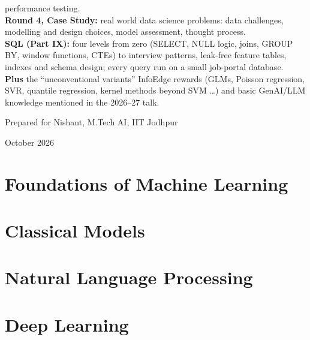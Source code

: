 \documentclass[11pt,openany]{book}
\begin{document}
\begin{titlepage}
\begin{tcolorbox}[colback=accentlight,colframe=accent,width=0.86\linewidth,arc=2pt,boxrule=0.6pt]
performance testing.\\[3pt]
\textbf{Round 4, Case Study:} real world data science problems: data challenges, modelling and design choices,
model assessment, thought process.\\[3pt]
\textbf{SQL (Part IX):} four levels from zero (SELECT, NULL logic, joins, GROUP BY, window functions, CTEs) to interview patterns,
leak-free feature tables, indexes and schema design; every query run on a small job-portal database.\\[3pt]
\textbf{Plus} the ``unconventional variants'' InfoEdge rewards (GLMs, Poisson regression, SVR, quantile
regression, kernel methods beyond SVM \dots) and basic GenAI/LLM knowledge mentioned in the 2026--27 talk.
\end{tcolorbox}
\vfill
{\large Prepared for Nishant, M.Tech AI, IIT Jodhpur\par}
{\large October 2026\par}
\end{titlepage}



\tableofcontents

\mainmatter
{}

\part{Foundations of Machine Learning}






\part{Classical Models}











\part{Natural Language Processing}



\part{Deep Learning}






\end{document}
